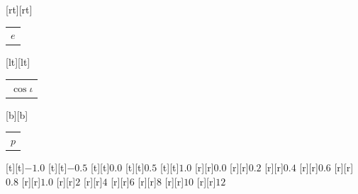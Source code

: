 %    
%
%
\begin{psfrags}%
\psfragscanon%
%
[rt][rt]{\color[rgb]{0,0,0}\setlength{\tabcolsep}{0pt}\begin{tabular}{r}{\Large$e$}\end{tabular}}%
[lt][lt]{\color[rgb]{0,0,0}\setlength{\tabcolsep}{0pt}\begin{tabular}{l}{\Large$\cos\iota$}\end{tabular}}%
[b][b]{\color[rgb]{0,0,0}\setlength{\tabcolsep}{0pt}\begin{tabular}{c}{\Large$p$}\end{tabular}}%
%
[t][t]{$-1.0$}%
[t][t]{$-0.5$}%
[t][t]{$0.0$}%
[t][t]{$0.5$}%
[t][t]{$1.0$}%
%
[r][r]{$0.0$}%
[r][r]{$0.2$}%
[r][r]{$0.4$}%
[r][r]{$0.6$}%
[r][r]{$0.8$}%
[r][r]{$1.0$}%
%
[r][r]{$2$}%
[r][r]{$4$}%
[r][r]{$6$}%
[r][r]{$8$}%
[r][r]{$10$}%
[r][r]{$12$}%
%
%
\end{psfrags}%
%
